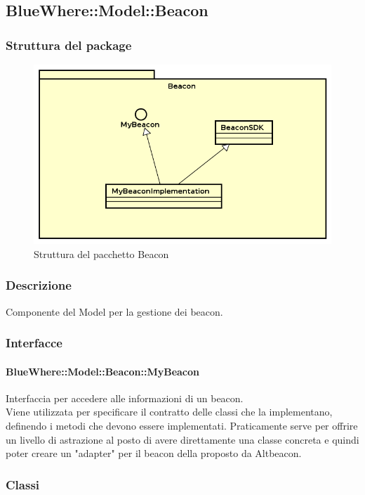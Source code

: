 \documentclass[../SpecificaTecnica.tex]{subfiles}
\begin{document}
	\subsection{BlueWhere::Model::Beacon}
		\subsubsection{Struttura del package}
		\begin{figure}[!h]
			\centering
			\includegraphics[scale=0.6]{diagrammi/Beacon.png}
				\caption{Struttura del pacchetto Beacon}
			\label{fig:Struttura_MVP}
		\end{figure} 
		\subsubsection{Descrizione}
			Componente del Model per la gestione dei beacon.
		\subsubsection{Interfacce}
			\paragraph{BlueWhere::Model::Beacon::MyBeacon}
				Interfaccia per accedere alle informazioni di un beacon. \\ 
				Viene utilizzata per specificare il contratto delle classi che la implementano, definendo i metodi che devono essere implementati. Praticamente serve per offrire un livello di astrazione al posto di avere direttamente una classe concreta e quindi poter creare un "adapter" per il beacon della proposto da Altbeacon.
		\subsubsection{Classi}
\end{document}

